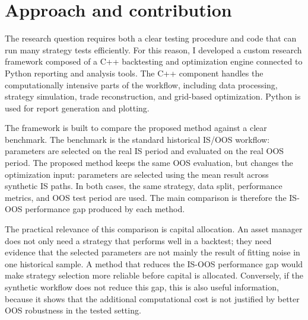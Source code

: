\section{Approach and contribution}

The research question requires both a clear testing procedure and code that can run many strategy
tests efficiently. For this reason, I developed a custom research framework composed of a C++
backtesting and optimization engine connected to Python reporting and analysis tools. The C++
component handles the computationally intensive parts of the workflow, including data processing,
strategy simulation, trade reconstruction, and grid-based optimization. Python is used for report
generation and plotting.

The framework is built to compare the proposed method against a clear benchmark. The benchmark is the
standard historical IS/OOS workflow: parameters are selected on the real IS period and evaluated on
the real OOS period. The proposed method keeps the same OOS evaluation, but changes the optimization
input: parameters are selected using the mean result across synthetic IS paths. In both cases, the
same strategy, data split, performance metrics, and OOS test period are used. The main comparison is
therefore the IS-OOS performance gap produced by each method.

The practical relevance of this comparison is capital allocation. An asset manager does not only need
a strategy that performs well in a backtest; they need evidence that the selected parameters are not
mainly the result of fitting noise in one historical sample. A method that reduces the IS-OOS
performance gap would make strategy selection more reliable before capital is allocated. Conversely,
if the synthetic workflow does not reduce this gap, this is also useful information, because it shows
that the additional computational cost is not justified by better OOS robustness in the tested
setting.
